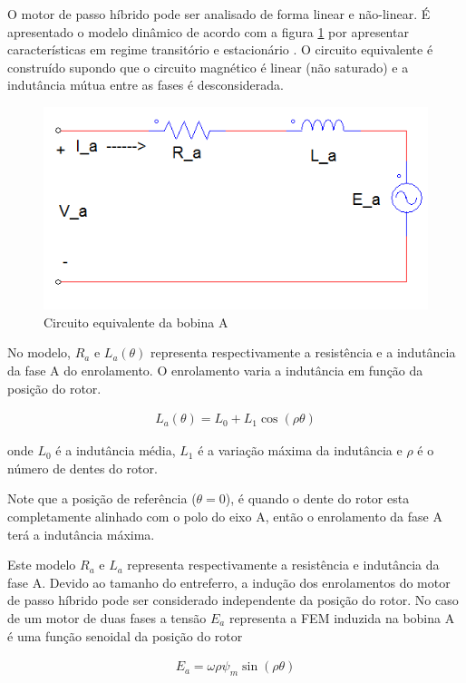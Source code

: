 
O motor de passo híbrido pode ser analisado de forma linear e não-linear. É apresentado o modelo dinâmico de acordo com a figura \ref{fig:fig1} por apresentar características em regime transitório e estacionário . O circuito equivalente é construído supondo que o circuito magnético é linear (não saturado) e a indutância mútua entre as fases é desconsiderada.

\begin{figure}[H]
	\centering
	\includegraphics[scale=.42]{Images/graficofasea.PNG}
	\caption{ Circuito equivalente da bobina A}
	\label{fig:fig1}
\end{figure}

No modelo, $R_a$ e $L_a(\theta)$ representa respectivamente a resistência e a indutância da fase A do enrolamento. O enrolamento varia a indutância em função da posição do rotor.

\begin{eqnarray}
	\label{eq:eq1a}
	L_a(\theta) = L_0 + L_1\cos(\rho \theta)
\end{eqnarray}

onde $L_0$ é a indutância média, $L_1$ é a variação máxima da indutância e $\rho$ é o número de dentes do rotor.

Note que a posição de referência ($\theta = 0$), é quando o dente do rotor esta completamente alinhado com o polo do eixo A, então o enrolamento da fase A terá a indutância máxima.

Este modelo $R_a$ e $L_a$ representa respectivamente a resistência e indutância da fase A. Devido ao tamanho do entreferro, a indução dos enrolamentos do motor de passo híbrido pode ser considerado independente da posição do rotor. No caso de um motor de duas fases a tensão $E_a$ representa a FEM induzida na bobina A é uma função senoidal da posição do rotor

\begin{eqnarray}
	\label{eq:eq2a}
	E_a = \omega \rho \psi_m \sin(\rho \theta)
\end{eqnarray}


